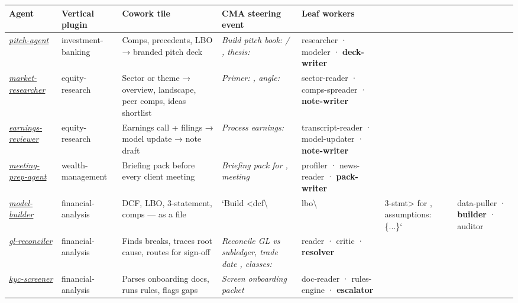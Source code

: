 \documentclass[11pt]{article}
\begin{document}
\begin{longtable}{>{\RaggedRight\arraybackslash\hspace{0pt}}p{}>{\RaggedRight\arraybackslash\hspace{0pt}}p{}>{\RaggedRight\arraybackslash\hspace{0pt}}p{}>{\RaggedRight\arraybackslash\hspace{0pt}}p{}>{\RaggedRight\arraybackslash\hspace{0pt}}p{}>{\RaggedRight\arraybackslash\hspace{0pt}}p{}>{\RaggedRight\arraybackslash\hspace{0pt}}p{}}
\toprule
{} \textbf{Agent} & \textbf{Vertical plugin} & \textbf{Cowork tile} & \textbf{CMA steering event} & \textbf{Leaf workers} & \textbf{} & \textbf{} \\
\midrule
{} \href{./ pitch-agent/}{\emph{pitch-agent}} & investment-banking & Comps, precedents, LBO → branded pitch deck & \emph{Build pitch book:  /  , thesis: } & researcher · modeler · \textbf{deck-writer} &  &  \\
{} \href{./ market-researcher/}{\emph{market-researcher}} & equity-research & Sector or theme → overview, landscape, peer comps, ideas shortlist & \emph{Primer: , angle: } & sector-reader · comps-spreader · \textbf{note-writer} &  &  \\
{} \href{./ earnings-reviewer/}{\emph{earnings-reviewer}} & equity-research & Earnings call + filings → model update → note draft & \emph{Process earnings:  } & transcript-reader · model-updater · \textbf{note-writer} &  &  \\
{} \href{./ meeting-prep-agent/}{\emph{meeting-prep-agent}} & wealth-management & Briefing pack before every client meeting & \emph{Briefing pack for , meeting } & profiler · news-reader · \textbf{pack-writer} &  &  \\
{} \href{./ model-builder/}{\emph{model-builder}} & financial-analysis & DCF, LBO, 3-statement, comps — as a file & `Build <dcf\textbackslash{} & lbo\textbackslash{} & 3-stmt> for , assumptions: \{...\}` & data-puller · \textbf{builder} · auditor \\
{} \href{./ gl-reconciler/}{\emph{gl-reconciler}} & financial-analysis & Finds breaks, traces root cause, routes for sign-off & \emph{Reconcile GL vs subledger, trade date , classes: } & reader · critic · \textbf{resolver} &  &  \\
{} \href{./ kyc-screener/}{\emph{kyc-screener}} & financial-analysis & Parses onboarding docs, runs rules, flags gaps & \emph{Screen onboarding packet } & doc-reader · rules-engine · \textbf{escalator} &  &  \\

\end{longtable}
\end{document}
